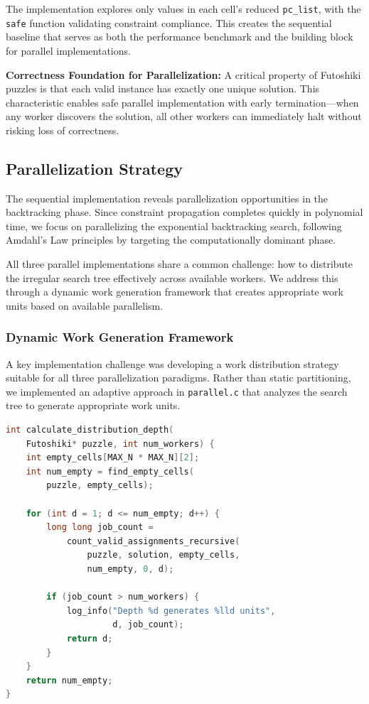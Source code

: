 The implementation explores only values in each cell's reduced \texttt{pc\_list}, with the \texttt{safe} function validating constraint compliance. This creates the sequential baseline that serves as both the performance benchmark and the building block for parallel implementations.

\textbf{Correctness Foundation for Parallelization:} A critical property of Futoshiki puzzles is that each valid instance has exactly one unique solution. This characteristic enables safe parallel implementation with early termination—when any worker discovers the solution, all other workers can immediately halt without risking loss of correctness.

\subsection{Parallelization Strategy}
\label{subsec:parallel_implementation}
The sequential implementation reveals parallelization opportunities in the backtracking phase. Since constraint propagation completes quickly in polynomial time, we focus on parallelizing the exponential backtracking search, following Amdahl's Law \cite{ahmdals_law} principles by targeting the computationally dominant phase.

All three parallel implementations share a common challenge: how to distribute the irregular search tree effectively across available workers. We address this through a dynamic work generation framework that creates appropriate work units based on available parallelism.

\subsubsection{Dynamic Work Generation Framework}
\label{subsubsec:dynamic_load_balancing}
A key implementation challenge was developing a work distribution strategy suitable for all three parallelization paradigms. Rather than static partitioning, we implemented an adaptive approach in \texttt{parallel.c} that analyzes the search tree to generate appropriate work units.

\begin{lstlisting}[language=C, caption=Dynamic depth calculation for work generation, label={listing:work_generation}]
int calculate_distribution_depth(
    Futoshiki* puzzle, int num_workers) {
    int empty_cells[MAX_N * MAX_N][2];
    int num_empty = find_empty_cells(
        puzzle, empty_cells);
    
    for (int d = 1; d <= num_empty; d++) {
        long long job_count = 
            count_valid_assignments_recursive(
                puzzle, solution, empty_cells, 
                num_empty, 0, d);
        
        if (job_count > num_workers) {
            log_info("Depth %d generates %lld units", 
                     d, job_count);
            return d;
        }
    }
    return num_empty;
}
\end{lstlisting}

